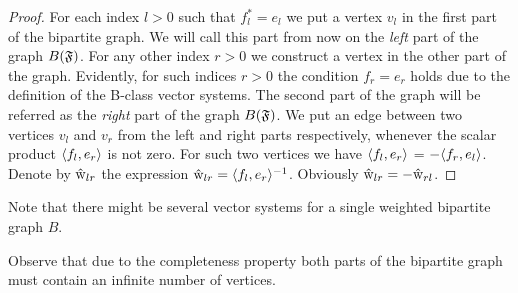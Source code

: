 \documentclass[12pt]{article}
\begin{document}
    \begin{proof}
      For each index $l > 0$ such that $f^*_l = e_l$ we put a vertex $v_l$ in the first part of the bipartite graph.
      We will call this part from now on the \emph{left} part of the graph $B(\mathfrak{F})$.
      For any other index $r > 0$ we construct a vertex in the other part of the graph.
      Evidently, for such indices $r > 0$ the condition $f_r = e_r$ holds due to the definition of the B-class vector systems.
      The second part of the graph will be referred as the \emph{right} part of the graph $B(\mathfrak{F})$.
      We put an edge between two vertices $v_l$ and $v_r$ from the left and right parts respectively,
      whenever the scalar product $\langle f_l, e_r \rangle$ is not zero.
      For such two vertices we have $\langle f_l, e_r \rangle$ = $-\langle f_r, e_l \rangle$.
      Denote by $\mathrm{\hat{w}}_{lr}$ the expression $\mathrm{\hat{w}}_{lr} = \langle f_l, e_r \rangle^{-1}$.
      Obviously $\mathrm{\hat{w}}_{lr} = -\mathrm{\hat{w}}_{rl}$.

    \end{proof}
    \begin{remark}
      Note that there might be several vector systems for a single weighted bipartite graph $B$.
    \end{remark}
    \begin{remark}
      Observe that due to the completeness property both parts of the bipartite graph must
        contain an infinite number of vertices.
    \end{remark}
\end{document}
